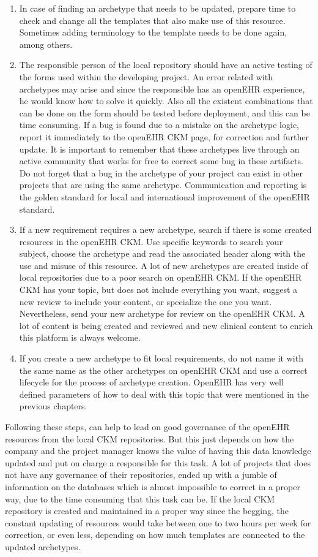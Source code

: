 \documentclass[mim_thesis.tex]{subfiles}
\begin{document}
\begin{enumerate}
\item In case of finding an archetype that needs to be updated, prepare time to check and change all the templates that also make use of this resource. Sometimes adding terminology to the template needs to be done again, among others.
\item The responsible person of the local repository should have an active testing of the forms used within the developing project. An error related with archetypes may arise and since the responsible has an openEHR experience, he would know how to solve it quickly. Also all the existent combinations that can be done on the form should be tested before deployment, and this can be time consuming. If a bug is found due to a mistake on the archetype logic, report it immediately to the openEHR CKM page, for correction and further update. It is important to remember that these archetypes live through an active community that works for free to correct some bug in these artifacts. Do not forget that a bug in the archetype of your project can exist in other projects that are using the same archetype. Communication and reporting is the golden standard for local and international improvement of the openEHR standard.
\item If a new requirement requires a new archetype, search if there is some created resources in the openEHR CKM. Use specific keywords to search your subject, choose the archetype and read the associated header along with the use and misuse of this resource. A lot of new archetypes are created inside of local repositories due to a poor search on openEHR CKM. If the openEHR CKM has your topic, but does not include everything you want, suggest a new review to include your content, or specialize the one you want. Nevertheless, send your new archetype for review on the openEHR CKM. A lot of content is being created and reviewed and new clinical content to enrich this platform is always welcome. 
\item If you create a new archetype to fit local requirements, do not name it with the same name as the other archetypes on openEHR CKM and use a correct lifecycle for the process of archetype creation. OpenEHR has very well defined parameters of how to deal with this topic that were mentioned in the previous chapters.

\end{enumerate}

Following these steps, can help to lead on good governance of the openEHR resources from the local CKM repositories. But this just depends on how the company and the project manager knows the value of having this data knowledge updated and put on charge a responsible for this task. A lot of projects that does not have any governance of their repositories, ended up with a jumble of information on the databases which is almost impossible to correct in a proper way,  due to the time consuming that this task can be. If the local CKM repository is created and maintained in a proper way since the begging, the constant updating of resources would take between one to two hours per week for correction, or even less, depending on how much templates are connected to the updated archetypes.  
\end{document}
